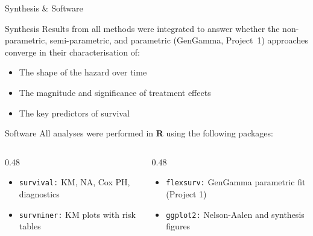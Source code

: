 \documentclass[aspectratio=169, 10pt]{beamer}
\begin{document}
\begin{frame}{Synthesis \& Software}
	
	\begin{block}{Synthesis}
		\small
		Results from all methods were integrated to answer whether the
		non-parametric, semi-parametric, and parametric (GenGamma,
		Project~1) approaches converge in their characterisation of:
		\begin{itemize}
			\small
			\item[$\blacksquare$] The shape of the hazard over time
			\item[$\blacksquare$] The magnitude and significance of
			treatment effects
			\item[$\blacksquare$] The key predictors of survival
		\end{itemize}
	\end{block}
	
	\vspace{6pt}
	
	\begin{block}{Software}
		\footnotesize
		All analyses were performed in \textbf{R} using the following
		packages:
		
		\vspace{4pt}
		\begin{columns}[T]
			
			\begin{column}{0.48\textwidth}
				\begin{itemize}
					\footnotesize
					\item[$\blacksquare$] \texttt{survival:} KM, NA,
					Cox PH, diagnostics
					\item[$\blacksquare$] \texttt{survminer:} KM plots
					with risk tables
				\end{itemize}
			\end{column}
			\begin{column}{0.48\textwidth}
				\begin{itemize}
					\footnotesize
					\item[$\blacksquare$] \texttt{flexsurv:} GenGamma
					parametric fit (Project 1)
					\item[$\blacksquare$] \texttt{ggplot2:} Nelson-Aalen
					and synthesis figures
				\end{itemize}
			\end{column}
		\end{columns}
	\end{block}
	
\end{frame}
\end{document}
